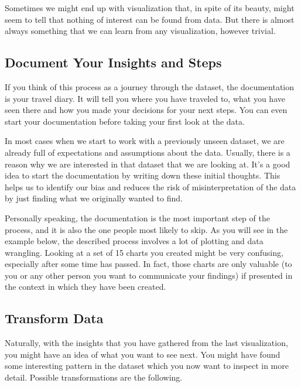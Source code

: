 \documentclass[]{book}
\begin{document}
Sometimes we might end up with visualization that, in spite of its beauty, might seem to tell that nothing of interest can be found from data. But there is almost always something that we can learn from any visualization, however trivial.

\hypertarget{document-your-insights-and-steps}{%
\subsection{Document Your Insights and Steps}\label{document-your-insights-and-steps}}

If you think of this process as a journey through the dataset, the documentation is your travel diary. It will tell you where you have traveled to, what you have seen there and how you made your decisions for your next steps. You can even start your documentation before taking your first look at the data.

In most cases when we start to work with a previously unseen dataset, we are already full of expectations and assumptions about the data. Usually, there is a reason why we are interested in that dataset that we are looking at. It's a good idea to start the documentation by writing down these initial thoughts. This helps us to identify our bias and reduces the risk of misinterpretation of the data by just finding what we originally wanted to find.

Personally speaking, the documentation is the most important step of the process, and it is also the one people most likely to skip. As you will see in the example below, the described process involves a lot of plotting and data wrangling. Looking at a set of 15 charts you created might be very confusing, especially after some time has passed. In fact, those charts are only valuable (to you or any other person you want to communicate your findings) if presented in the context in which they have been created.

\hypertarget{transform-data}{%
\subsection{Transform Data}\label{transform-data}}

Naturally, with the insights that you have gathered from the last visualization, you might have an idea of what you want to see next. You might have found some interesting pattern in the dataset which you now want to inspect in more detail. Possible transformations are the following.
\end{document}
